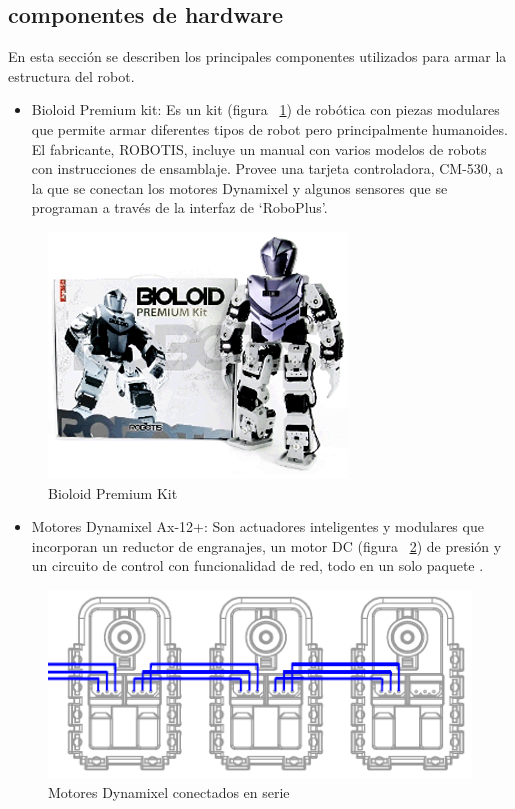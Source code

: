 \subsection{componentes de hardware}
En esta sección se describen los principales componentes utilizados para armar la estructura del robot.
\begin{itemize}
\item Bioloid Premium kit: Es un kit (figura ~\ref{fig:kit}) de robótica con piezas modulares que permite armar diferentes tipos de robot pero principalmente humanoides. El fabricante, ROBOTIS, incluye un manual con varios modelos de robots con instrucciones de ensamblaje. Provee una tarjeta controladora, CM-530, a la que se conectan los motores Dynamixel y algunos sensores que se programan a través de la interfaz de ‘RoboPlus’. \cite{robotics}

\end{itemize}

\begin{figure}[hbtp]

\centering
\includegraphics[scale=0.5]{imagenes/product_bioloid17.png}
\caption{Bioloid Premium Kit}
\label{fig:kit}
\end{figure}

\begin{itemize}

\item Motores Dynamixel Ax-12+: Son actuadores inteligentes y modulares que incorporan un reductor de engranajes, un motor DC  (figura ~\ref{fig:motoresDc})
de presión y un circuito de control con funcionalidad de red, todo en un solo paquete \cite{manual}. 
\end{itemize}

\begin{figure}[hbtp]
\label{fig:motoresDc}
\centering
\includegraphics[scale=0.5]{imagenes/AX-12_serie.png}
\caption{Motores Dynamixel conectados en serie}
\end{figure}

